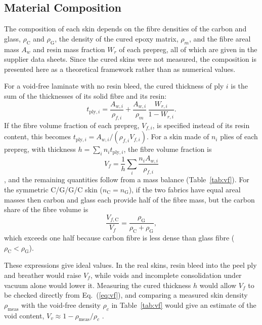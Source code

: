 \begin{addedblock}
\subsection{Material Composition}
\label{sec:composition}

The composition of each skin depends on the fibre densities of the
carbon and glass, $\rho_\mathrm{C}$ and $\rho_\mathrm{G}$, the density
of the cured epoxy matrix, $\rho_m$, and the fibre areal mass $A_w$ and
resin mass fraction $W_r$ of each prepreg, all of which are given in
the supplier data sheets. Since the cured skins were not measured, the
composition is presented here as a theoretical framework rather than
as numerical values.

For a void-free laminate with no resin bleed, the cured thickness of
ply $i$ is the sum of the thicknesses of its solid fibre and its resin:
\begin{equation}
    t_{\mathrm{ply},i} = \frac{A_{w,i}}{\rho_{f,i}}
    + \frac{A_{w,i}}{\rho_m}\,\frac{W_{r,i}}{1-W_{r,i}}.
    \label{eq:cpt}
\end{equation}
If the fibre volume fraction of each prepreg, $V_{f,i}$, is specified
instead of its resin content, this becomes
$t_{\mathrm{ply},i} = A_{w,i}/(\rho_{f,i}V_{f,i})$. For a skin made of
$n_i$ plies of each prepreg, with thickness
$h = \sum_i n_i t_{\mathrm{ply},i}$, the fibre volume fraction is
\begin{equation}
    V_f = \frac{1}{h}\sum_i \frac{n_i A_{w,i}}{\rho_{f,i}}
    \label{eq:vf}
\end{equation}
\citep{astm_d3171}, and the remaining quantities follow from a mass
balance (Table~\ref{tab:vf}). For the symmetric C/G/G/C skin
($n_\mathrm{C} = n_\mathrm{G}$), if the two fabrics have equal areal
masses then carbon and glass each provide half of the fibre mass, but
the carbon share of the fibre volume is
\begin{equation}
    \frac{V_{f,\mathrm{C}}}{V_f} = \frac{\rho_\mathrm{G}}{\rho_\mathrm{C}+\rho_\mathrm{G}},
    \label{eq:cshare}
\end{equation}
which exceeds one half because carbon fibre is less dense than glass
fibre ($\rho_\mathrm{C} < \rho_\mathrm{G}$).

These expressions give ideal values. In the real skins, resin bleed
into the peel ply and breather would raise $V_f$, while voids and
incomplete consolidation under vacuum alone would lower it. Measuring
the cured thickness $h$ would allow $V_f$ to be checked directly from
Eq.~(\ref{eq:vf}), and comparing a measured skin density
$\rho_\mathrm{meas}$ with the void-free density $\rho_c$ in
Table~\ref{tab:vf} would give an estimate of the void content,
$V_v \approx 1 - \rho_\mathrm{meas}/\rho_c$ \citep{astm_d3171}.
\end{addedblock}

